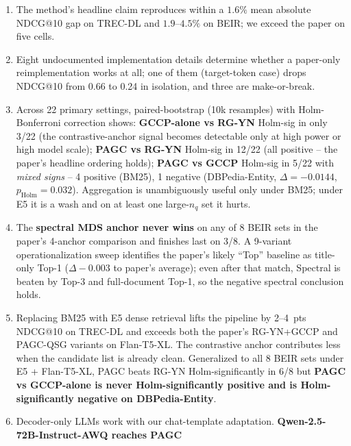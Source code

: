\documentclass[sigconf]{acmart}
\begin{document}
\begin{enumerate}[leftmargin=1.5em,nosep]
    \item The method's headline claim reproduces within a $1.6\%$
          mean absolute NDCG@10 gap on TREC-DL and $1.9$--$4.5\%$
          on BEIR; we exceed the paper on five cells.
    \item Eight undocumented implementation details determine whether
          a paper-only reimplementation works at all; one of them
          (target-token case) drops NDCG@10 from 0.66 to 0.24 in
          isolation, and three are make-or-break.
    \item Across 22 primary settings, paired-bootstrap (10k
          resamples) with Holm-Bonferroni correction shows:
          \textbf{GCCP-alone vs RG-YN} Holm-sig in only 3/22 (the
          contrastive-anchor signal becomes detectable only at high
          power or high model scale); \textbf{PAGC vs RG-YN}
          Holm-sig in 12/22 (all positive -- the paper's headline
          ordering holds); \textbf{PAGC vs GCCP} Holm-sig in 5/22
          with \emph{mixed signs} -- 4 positive (BM25), 1 negative
          (DBPedia-Entity, $\Delta{=}{-}0.0144$, $p_{\text{Holm}}{=}0.032$).
          Aggregation is unambiguously useful only under BM25;
          under E5 it is a wash and on at least one large-$n_q$
          set it hurts.
    \item The \textbf{spectral MDS anchor never wins} on any of
          8 BEIR sets in the paper's 4-anchor comparison and
          finishes last on 3/8. A 9-variant operationalization
          sweep identifies the paper's likely ``Top'' baseline as
          title-only Top-1 ($\Delta{-}0.003$ to paper's average);
          even after that match, Spectral is beaten by Top-3 and
          full-document Top-1, so the negative spectral conclusion
          holds.
    \item Replacing BM25 with E5 dense retrieval lifts the
          pipeline by 2--4~pts NDCG@10 on TREC-DL and exceeds both
          the paper's RG-YN+GCCP and PAGC-QSG variants on
          Flan-T5-XL. The contrastive anchor contributes less when
          the candidate list is already clean. Generalized to all
          8 BEIR sets under E5 + Flan-T5-XL, PAGC beats RG-YN
          Holm-significantly in 6/8 but \textbf{PAGC vs GCCP-alone
          is never Holm-significantly positive and is
          Holm-significantly negative on DBPedia-Entity}.
    \item Decoder-only LLMs work with our chat-template adaptation.
          \textbf{Qwen-2.5-72B-Instruct-AWQ reaches PAGC
}
\end{enumerate}
\end{document}

